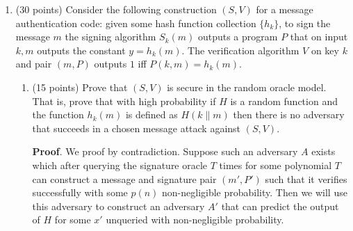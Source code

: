 \documentclass{article}
\begin{document}
\begin{enumerate}[,start=4]%

\item{}
(30 points) Consider the following construction $(S,V)$ for a message authentication code: given some hash function collection $\{ h_k \}$, to sign the message $m$ the signing algorithm  $S_k(m)$ outputs a   program $P$ that on input $k,m$    outputs the constant $y=h_k(m)$. The verification algorithm $V$ on key $k$ and pair $(m,P)$ outputs $1$ iff $P(k,m)=h_k(m)$.%

\begin{enumerate}[,label=\alph*.]%

\item{}
(15 points) Prove that $(S,V)$ is secure in the random oracle model. That is, prove that with high probability if $H$ is a random function and the function $h_k(m)$ is defined as $H(k\|m)$ then there is no adversary that succeeds in a chosen message attack against $(S,V)$.%

\begin{mdbmarginx}{1ex}{0pt}{1ex}{0pt}%
\noindent{}\textbf{Proof}.  We proof by contradiction. Suppose such an adversary $A$ exists which after querying the 
signature oracle $T$ times for some polynomial $T$ can construct a message and signature pair
$(m',P')$ such that it verifies successfully with some $p(n)$ non-negligible probability. 
Then we will use this adversary to construct an adversary $A'$ that can predict the output
of $H$ for some $x'$ unqueried with non-negligible probability.%


\end{mdbmarginx}
\end{enumerate}
\end{enumerate}
\end{document}
